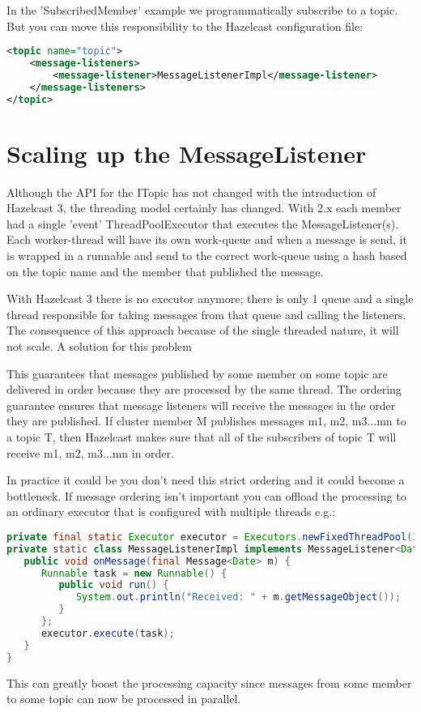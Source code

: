 In the 'SubscribedMember' example we programmatically subscribe to a topic. But you can move this responsibility to the  Hazelcast configuration file:
\begin{lstlisting}[language=xml]
<topic name="topic">
    <message-listeners>
        <message-listener>MessageListenerImpl</message-listener>
    </message-listeners>
</topic>
\end{lstlisting}

\section{Scaling up the MessageListener}
Although the API for the ITopic has not changed with the introduction of Hazelcast 3, the threading model certainly has changed. With 2.x each member had a single 'event' ThreadPoolExecutor that executes the MessageListener(s). Each worker-thread will have its own work-queue and when a message is send, it is wrapped in a runnable and send to the correct work-queue using a hash based on the topic name and the member that published the message.

With Hazelcast 3 there is no executor anymore; there is only 1 queue and a single thread responsible for taking messages from that queue and calling the listeners. The consequence of this approach because of the single threaded nature, it will not scale. A solution for this problem 

This guarantees that messages published by some member on some topic are delivered in order because they are processed by the same thread. The ordering guarantee ensures that message listeners will receive the messages in the order they are published. If cluster member M publishes messages m1, m2, m3...mn to a topic T, then Hazelcast makes sure that all of the subscribers of topic T will receive m1, m2, m3...mn in order. 

In practice it could be you don't need this strict ordering and it could become a bottleneck. If message ordering isn't important you can offload the processing to an ordinary executor that is configured with multiple threads e.g.:
\begin{lstlisting}[language=java]
private final static Executor executor = Executors.newFixedThreadPool(10);       
private static class MessageListenerImpl implements MessageListener<Date> {
   public void onMessage(final Message<Date> m) {
      Runnable task = new Runnable() {
         public void run() {
            System.out.println("Received: " + m.getMessageObject());
         }
      };
      executor.execute(task);
   }
} 
\end{lstlisting}
This can greatly boost the processing capacity since messages from some member to some topic can now be processed in parallel.

